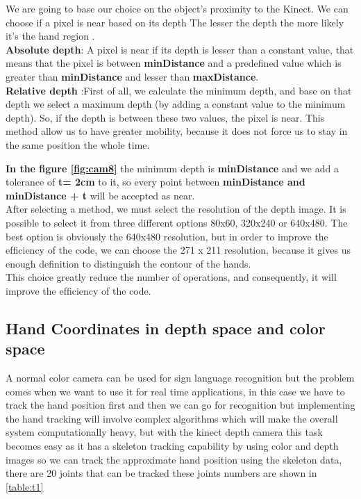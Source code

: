 We are going to base our choice on the object’s proximity to the Kinect. We can choose if a pixel is near based on its depth  The lesser the depth the more likely it’s the hand region .\\\textbf{ Absolute depth}: A pixel is near if its depth is lesser than a constant value, that means that the pixel is between \textbf{minDistance }and a predefined value which is greater than \textbf{minDistance }and lesser than \textbf{maxDistance}.\\\textbf{Relative depth }:First of all,  we calculate the minimum depth, and  base on that depth we select a maximum depth (by adding a constant value to the minimum depth). So, if the depth is between these two values, the pixel is near. This method allow us to have greater mobility, because it does not force us to stay in the same position the whole time. 

\textbf{In the figure \ref{fig:cam8}} the minimum depth is \textbf{minDistance} and we add a tolerance of\textbf{  t= 2cm }to it, so every point between \textbf{minDistance and minDistance + t }  will be accepted as near.\\After selecting a method, we must select the resolution of the depth image. It is possible to select it from three different  options 80x60, 320x240 or 640x480. The best option is obviously the 640x480 resolution, but in order to improve the efﬁciency of the code, we can choose the 271 x 211 resolution, because it gives us enough deﬁnition to distinguish the contour  of the hands. \\This choice greatly reduce the number of operations, and consequently, it will improve the efﬁciency of the code.

\subsection{Hand Coordinates in depth space and color space }
A normal color camera can be used for sign language recognition but the problem comes when we want to use it for real time applications, in this case we have to track the hand position first and then we can go for recognition but implementing the hand tracking will involve complex algorithms which will make the overall system  computationally heavy, but with the kinect depth camera this task becomes easy as it has a skeleton tracking capability by using color and depth images so we can track the approximate hand position using the skeleton data, there are 20 joints that can be tracked these joints numbers are shown in \ref{table:t1}\\

